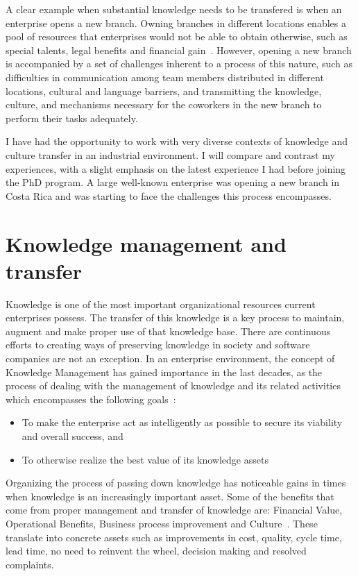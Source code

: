 \documentclass[12pt, letterpaper]{article}
\begin{document}
A clear example when substantial knowledge needs to be transfered is when an enterprise opens a new branch.
Owning branches in different locations enables a pool of resources that enterprises would not be able
to obtain otherwise, such as special talents, legal benefits and financial gain~\cite{ceruttia07}. However, 
opening a new branch is accompanied by a set of challenges inherent to a process of this nature, such as 
difficulties in communication among team members distributed in different locations, 
cultural and language barriers, and transmitting the knowledge, culture, and mechanisms necessary for the 
coworkers in the new branch to perform their tasks adequately.

I have had the opportunity to work with very diverse contexts of knowledge and culture transfer in 
an industrial environment. I will compare and contrast my experiences, with a slight emphasis on the 
latest experience I had before joining the PhD program. A large well-known enterprise was 
opening a new branch in Costa Rica and was starting to face the challenges this process encompasses.  


\section{Knowledge management and transfer}
Knowledge is one of the most important organizational resources current enterprises possess.
The transfer of this knowledge is a key process to maintain, augment and
make proper use of that knowledge base. 
There are continuous efforts to creating ways of preserving knowledge in society and software 
companies are not an exception. In an enterprise environment, the concept of Knowledge Management
has gained importance in the last decades, as the process of dealing with the management 
of knowledge and its related activities which encompasses 
the following goals~\cite{wiig97}: 
\begin{itemize}
\item To make the enterprise act as intelligently as possible to secure its viability and overall success, and
\item To otherwise realize the best value of its knowledge assets
\end{itemize}

Organizing the process of passing down knowledge has noticeable gains in times
when knowledge is an increasingly important asset. Some of the benefits that come from proper management and transfer of knowledge are: Financial
Value, Operational Benefits, Business process improvement and Culture~\cite{ibrahim09}. These translate into concrete assets such as
improvements in cost, quality, cycle time, lead time, no need to reinvent the wheel, decision making and resolved complaints.
\end{document}
